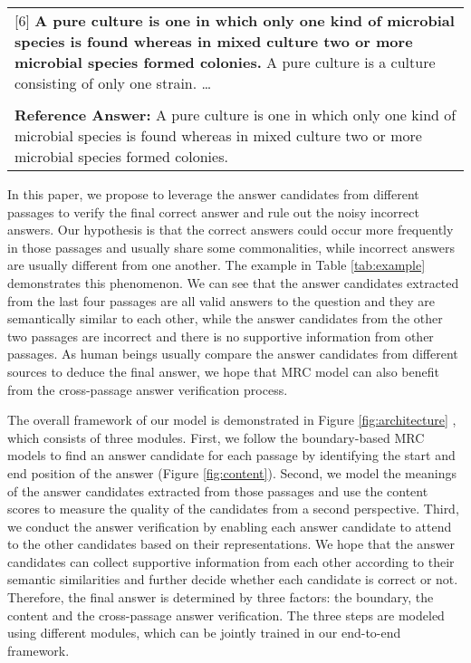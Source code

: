 \documentclass[11pt,a4paper]{article}
\newcommand{\figref}[1]{Figure \ref{#1}}
\newcommand{\tabref}[1]{Table \ref{#1}}
\begin{document}
\begin{table*}[htbp]
\begin{tabular}{p{\textwidth}}
[6] \textbf{A pure culture is one in which only one kind of microbial species is found whereas in mixed culture two or more microbial species formed colonies.} A pure culture is a culture consisting of only one strain. \ldots \\

  \\
\hline
\textbf{Reference Answer:} A pure culture is one in which only one kind of microbial species is found whereas in mixed culture two or more microbial species formed colonies. \\
\hline
\end{tabular}
\caption{An example from MS-MARCO. The text in bold is the predicted answer candidate from each passage according to the boundary model. The candidate from [1] is chosen as the final answer by this model, while the correct answer is from [6] and can be verified by the answers from [3], [4], [5]. } \label{tab:example}
\end{table*}






In this paper, we propose to leverage the answer candidates from different passages to verify the final correct answer and rule out the noisy incorrect answers. 
Our hypothesis is that the correct answers could occur more frequently in those passages and usually share some commonalities, while incorrect answers are usually different from one another. The example in \tabref{tab:example} demonstrates this phenomenon. We can see that the answer candidates extracted from the last four passages are all valid answers to the question and they are semantically similar to each other, while the answer candidates from the other two passages are incorrect and there is no supportive information from other passages. As human beings usually compare the answer candidates from different sources to deduce the final answer, we hope that MRC model can also benefit from the cross-passage answer verification process.



The overall framework of our model is demonstrated in \figref{fig:architecture} , which consists of three modules. First, we follow the boundary-based MRC models \cite{bidaf,match-lstm} to find an answer candidate for each passage by identifying the start and end position of the answer (\figref{fig:content}). Second, we model the meanings of the answer candidates extracted from those passages and use the content scores to measure the quality of the candidates from a second perspective. Third, we conduct the answer verification by enabling each answer candidate to attend to the other candidates based on their representations. We hope that the answer candidates can collect supportive information from each other according to their semantic similarities and further decide whether each candidate is correct or not. Therefore, the final answer is determined by three factors: the boundary, the content and the cross-passage answer verification. The three steps are modeled using different modules, which can be jointly trained in our end-to-end framework. 
\end{document}
